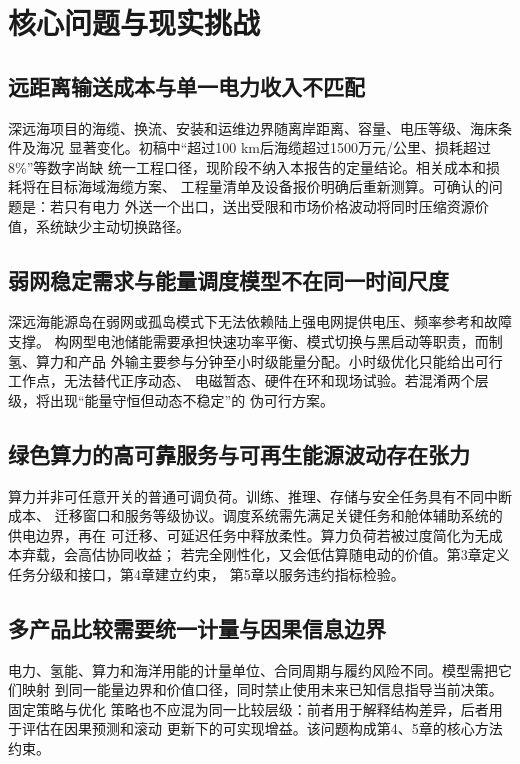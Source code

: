 \section{核心问题与现实挑战}

\subsection{远距离输送成本与单一电力收入不匹配}

深远海项目的海缆、换流、安装和运维边界随离岸距离、容量、电压等级、海床条件及海况
显著变化。初稿中“超过100 km后海缆超过1500万元/公里、损耗超过8\%”等数字尚缺
统一工程口径，现阶段不纳入本报告的定量结论。相关成本和损耗将在目标海域海缆方案、
工程量清单及设备报价明确后重新测算。可确认的问题是：若只有电力
外送一个出口，送出受限和市场价格波动将同时压缩资源价值，系统缺少主动切换路径。

\subsection{弱网稳定需求与能量调度模型不在同一时间尺度}

深远海能源岛在弱网或孤岛模式下无法依赖陆上强电网提供电压、频率参考和故障支撑。
构网型电池储能需要承担快速功率平衡、模式切换与黑启动等职责，而制氢、算力和产品
外输主要参与分钟至小时级能量分配。小时级优化只能给出可行工作点，无法替代正序动态、
电磁暂态、硬件在环和现场试验。若混淆两个层级，将出现“能量守恒但动态不稳定”的
伪可行方案。

\subsection{绿色算力的高可靠服务与可再生能源波动存在张力}

算力并非可任意开关的普通可调负荷。训练、推理、存储与安全任务具有不同中断成本、
迁移窗口和服务等级协议。调度系统需先满足关键任务和舱体辅助系统的供电边界，再在
可迁移、可延迟任务中释放柔性。算力负荷若被过度简化为无成本弃载，会高估协同收益；
若完全刚性化，又会低估算随电动的价值。第3章定义任务分级和接口，第4章建立约束，
第5章以服务违约指标检验。

\subsection{多产品比较需要统一计量与因果信息边界}

电力、氢能、算力和海洋用能的计量单位、合同周期与履约风险不同。模型需把它们映射
到同一能量边界和价值口径，同时禁止使用未来已知信息指导当前决策。固定策略与优化
策略也不应混为同一比较层级：前者用于解释结构差异，后者用于评估在因果预测和滚动
更新下的可实现增益。该问题构成第4、5章的核心方法约束。

